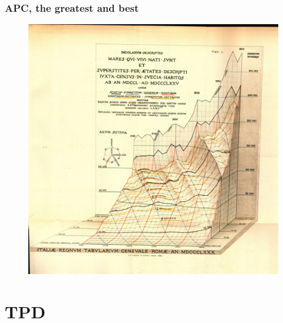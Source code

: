 \documentclass[20pt]{beamer}
\begin{document}
\begin{frame}
\frametitle{APC, the greatest and best}
\begin{figure}[b]
    \centering
    \includegraphics[scale=.5]{Figures/LabPres/Perozzo1000px_cropped_adj.png}
\end{figure} 
\end{frame}

\section{TPD}

\begin{frame}
\begin{figure}[hpt!]
\end{figure}
\end{frame}
\end{document}
